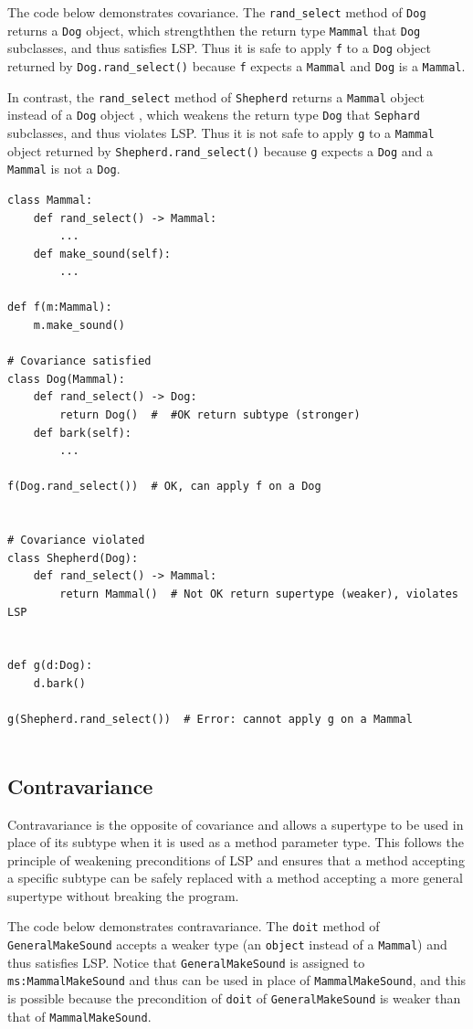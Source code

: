 \documentclass[oneside,11pt,dvipsnames]{book}
\newcommand{\code}[1]{\texttt{#1}}
\begin{document}
The code below demonstrates covariance. The \code{rand\_select} method of \code{Dog} returns a \code{Dog} object, which strengththen the return type \code{Mammal} that \code{Dog} subclasses, and thus satisfies LSP. Thus it is safe to apply \code{f} to a \code{Dog} object returned by \code{Dog.rand\_select()} because \code{f} expects a \code{Mammal} and \code{Dog} is a \code{Mammal}.

In contrast, the \code{rand\_select} method of \code{Shepherd} returns a \code{Mammal} object instead of a \code{Dog} object , which weakens the return type \code{Dog} that \code{Sephard} subclasses, and thus violates LSP. Thus it is not safe to apply \code{g} to a \code{Mammal} object returned by \code{Shepherd.rand\_select()} because \code{g} expects a \code{Dog} and a \code{Mammal} is not a \code{Dog}.

\begin{lstlisting}
class Mammal:
    def rand_select() -> Mammal:
        ...
    def make_sound(self):
        ...    

def f(m:Mammal):
    m.make_sound()
    
# Covariance satisfied
class Dog(Mammal):    
    def rand_select() -> Dog:
        return Dog()  #  #OK return subtype (stronger)
    def bark(self):
        ...

f(Dog.rand_select())  # OK, can apply f on a Dog


# Covariance violated
class Shepherd(Dog):
    def rand_select() -> Mammal:
        return Mammal()  # Not OK return supertype (weaker), violates LSP


def g(d:Dog):
    d.bark()

g(Shepherd.rand_select())  # Error: cannot apply g on a Mammal


\end{lstlisting}

\subsection{Contravariance}
Contravariance is the opposite of covariance and 
allows a supertype to be used in place of its subtype when it is used as a method parameter type.  This follows the principle of weakening preconditions of LSP and ensures that a method accepting a specific subtype can be safely replaced with a method accepting a more general supertype without breaking the program.

The code below demonstrates contravariance. The \code{doit} method of \code{GeneralMakeSound} accepts a weaker type (an \code{object} instead of a \code{Mammal}) and thus satisfies LSP. Notice that \code{GeneralMakeSound} is assigned to \code{ms:MammalMakeSound} and thus can be used in place of \code{MammalMakeSound}, and this is possible because the precondition of \code{doit} of \code{GeneralMakeSound} is weaker than that of \code{MammalMakeSound}.
\end{document}
